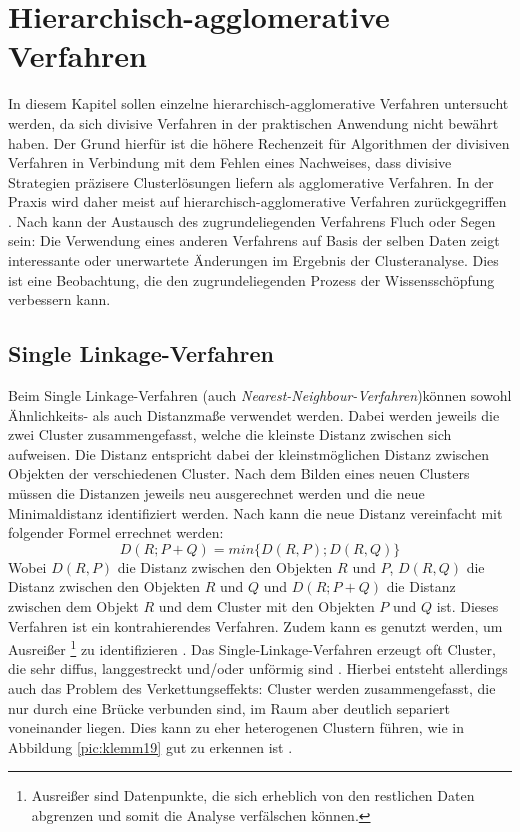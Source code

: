 \chapter{Hierarchisch-agglomerative Verfahren}
In diesem Kapitel sollen einzelne hierarchisch-agglomerative Verfahren untersucht werden, da sich divisive Verfahren in der praktischen Anwendung nicht bewährt haben. Der Grund hierfür ist die höhere Rechenzeit für Algorithmen der divisiven Verfahren in Verbindung mit dem Fehlen eines Nachweises, dass divisive Strategien präzisere Clusterlösungen liefern als agglomerative Verfahren. In der Praxis wird daher meist auf hierarchisch-agglomerative Verfahren zurückgegriffen \citep[Vgl.][S. 46]{Pedrycz.2010}.
Nach \citet[S.378]{Piegorsch.2015} kann der Austausch des zugrundeliegenden Verfahrens Fluch oder Segen sein: Die Verwendung eines anderen Verfahrens auf Basis der selben Daten zeigt interessante oder unerwartete Änderungen im Ergebnis der Clusteranalyse. Dies ist eine Beobachtung, die den zugrundeliegenden Prozess der Wissensschöpfung verbessern kann.

\section{Single Linkage-Verfahren}
Beim Single Linkage-Verfahren (auch \textit{Nearest-Neighbour-Verfahren})können sowohl Ähnlichkeits- als auch Distanzmaße verwendet werden. Dabei werden jeweils die zwei Cluster zusammengefasst, welche die kleinste Distanz zwischen sich aufweisen. Die Distanz entspricht dabei der kleinstmöglichen Distanz zwischen Objekten der verschiedenen Cluster. Nach dem Bilden eines neuen Clusters müssen die Distanzen jeweils neu ausgerechnet werden und die neue Minimaldistanz identifiziert werden.
Nach \citet[S.481]{Backhaus.2016} kann die neue Distanz vereinfacht mit folgender Formel errechnet werden:
\begin{equation}
	D(R;P+Q) = min\{D(R,P);D(R,Q)\}
\end{equation}
Wobei $D(R,P)$ die Distanz zwischen den Objekten $R$ und $P$, $D(R,Q)$ die Distanz zwischen den Objekten $R$ und $Q$ und $D(R;P+Q)$ die Distanz zwischen dem Objekt $R$ und dem Cluster mit den Objekten $P$ und $Q$ ist.
Dieses Verfahren ist ein kontrahierendes Verfahren. Zudem kann es genutzt werden, um Ausreißer \footnote{Ausreißer sind Datenpunkte, die sich erheblich von den restlichen Daten abgrenzen und somit die Analyse verfälschen können.} zu identifizieren \citep[Vgl.][S. 481-483]{Backhaus.2016}. 
Das Single-Linkage-Verfahren erzeugt oft Cluster, die sehr diffus, langgestreckt und/oder unförmig sind \citep[Vgl.][S. 377]{Piegorsch.2015}.
Hierbei entsteht allerdings auch das Problem des Verkettungseffekts: Cluster werden zusammengefasst, die nur durch eine Brücke verbunden sind, im Raum aber deutlich separiert voneinander liegen. Dies kann zu eher heterogenen Clustern führen, wie in Abbildung \ref{pic:klemm19} gut zu erkennen ist \citep[Vgl.][S. 233]{Eckey.2002}. 

